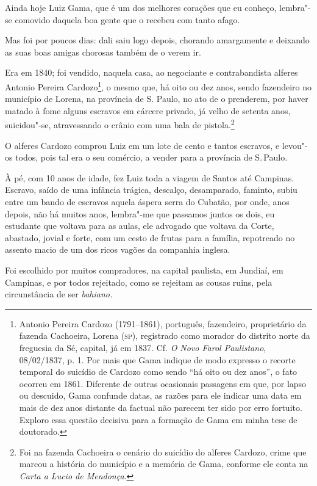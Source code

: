 Ainda hoje Luiz Gama, que é um dos melhores corações que eu conheço,
lembra"-se comovido daquela boa gente que o recebeu com tanto afago.

Mas foi por poucos dias: dali saiu logo depois, chorando amargamente e
deixando as suas boas amigas chorosas também de o verem ir.

Era em 1840; foi vendido, naquela casa, ao negociante e contrabandista
alferes Antonio Pereira Cardozo\footnote{Antonio Pereira Cardozo
  (1791--1861), português, fazendeiro, proprietário da fazenda Cachoeira,
  Lorena (\textsc{sp}), registrado como morador do distrito norte da freguesia da
  Sé, capital, já em 1837. Cf. \emph{O Novo Farol Paulistano},
  08/02/1837, p. 1. Por mais que Gama indique de modo expresso o
  recorte temporal do suicídio de Cardozo como sendo ``há oito ou dez
  anos'', o fato ocorreu em 1861. Diferente de outras ocasionais
  passagens em que, por lapso ou descuido, Gama confunde datas, as razões
  para ele indicar uma data em mais de dez anos distante da factual não
  parecem ter sido por erro fortuito. Exploro essa questão decisiva para
  a formação de Gama em minha tese de doutorado.}, o mesmo que, há oito
ou dez anos, sendo fazendeiro no município de Lorena, na província de S.
Paulo, no ato de o prenderem, por haver matado à fome alguns escravos em
cárcere privado, já velho de setenta anos, suicidou"-se, atravessando o
crânio com uma bala de pistola.\footnote{Foi na fazenda Cachoeira o
  cenário do suicídio do alferes Cardozo, crime que marcou a história do
  município e a memória de Gama, conforme ele conta na \emph{Carta a
  Lucio de Mendonça}.}

O alferes Cardozo comprou Luiz em um lote de cento e tantos escravos, e
levou"-os todos, pois tal era o seu comércio, a vender para a província
de S.\,Paulo.

À pé, com 10 anos de idade, fez Luiz toda a viagem de Santos até
Campinas. Escravo, saído de uma infância trágica, descalço, desamparado,
faminto, subiu entre um bando de escravos aquela áspera serra do
Cubatão, por onde, anos depois, não há muitos anos, lembra"-me que
passamos juntos os dois, eu estudante que voltava para as aulas, ele
advogado que voltava da Corte, abastado, jovial e forte, com um cesto de
frutas para a família, repotreado no assento macio de um dos ricos
vagões da companhia inglesa.

Foi escolhido por muitos compradores, na capital paulista, em
Jundiaí,
em Campinas, e por todos rejeitado, como se rejeitam as cousas ruins,
pela circunstância de ser \emph{bahiano.}


